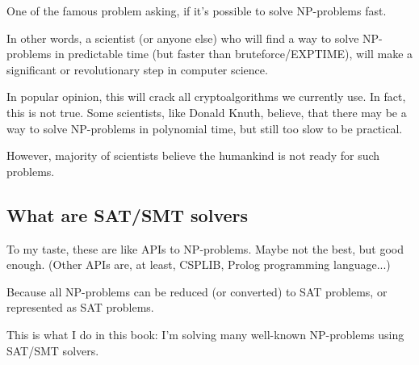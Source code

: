 One of the famous problem asking, if it's possible to solve NP-problems fast.

In other words, a scientist (or anyone else) who will find a way to solve NP-problems in predictable time (but faster than bruteforce/EXPTIME),
will make a significant or revolutionary step in computer science.

In popular opinion, this will crack all cryptoalgorithms we currently use.
In fact, this is not true.
Some scientists, like Donald Knuth, believe, that there may be a way to solve NP-problems in polynomial time, but still too
slow to be practical.

However, majority of scientists believe the humankind is not ready for such problems.

\subsection{What are SAT/SMT solvers}

To my taste, these are like APIs to NP-problems.
Maybe not the best, but good enough.
(Other APIs are, at least, CSPLIB, Prolog programming language...)

Because all NP-problems can be reduced (or converted) to SAT problems, or represented as SAT problems.

This is what I do in this book: I'm solving many well-known NP-problems using SAT/SMT solvers.

